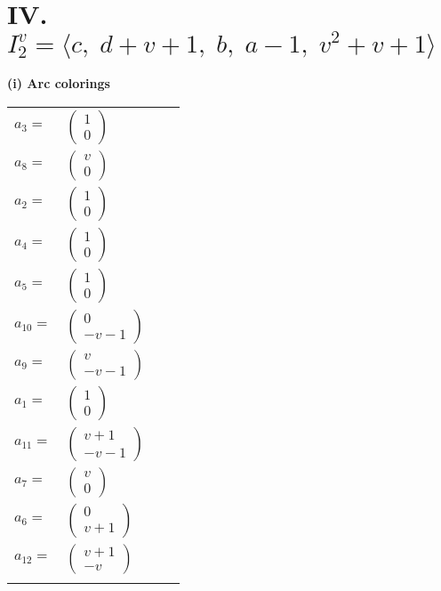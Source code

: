 \documentclass[1p]{elsarticle_modified}
\theoremstyle{definition}
\begin{document}
\centering \section*{IV. $I^v_{2}= \langle c,\;d+v+1,\;b,\;a-1,\;v^2+v+1 \rangle$}
\flushleft \textbf{(i) Arc colorings}\\
\begin{tabular}{m{7pt} m{180pt} m{7pt} m{180pt} }
\flushright $a_{3}=$&$\begin{pmatrix}1\\0\end{pmatrix}$ \\
\flushright $a_{8}=$&$\begin{pmatrix}v\\0\end{pmatrix}$ \\
\flushright $a_{2}=$&$\begin{pmatrix}1\\0\end{pmatrix}$ \\
\flushright $a_{4}=$&$\begin{pmatrix}1\\0\end{pmatrix}$ \\
\flushright $a_{5}=$&$\begin{pmatrix}1\\0\end{pmatrix}$ \\
\flushright $a_{10}=$&$\begin{pmatrix}0\\- v-1\end{pmatrix}$ \\
\flushright $a_{9}=$&$\begin{pmatrix}v\\- v-1\end{pmatrix}$ \\
\flushright $a_{1}=$&$\begin{pmatrix}1\\0\end{pmatrix}$ \\
\flushright $a_{11}=$&$\begin{pmatrix}v+1\\- v-1\end{pmatrix}$ \\
\flushright $a_{7}=$&$\begin{pmatrix}v\\0\end{pmatrix}$ \\
\flushright $a_{6}=$&$\begin{pmatrix}0\\v+1\end{pmatrix}$ \\
\flushright $a_{12}=$&$\begin{pmatrix}v+1\\- v\end{pmatrix}$\\&\end{tabular}
\end{document}
